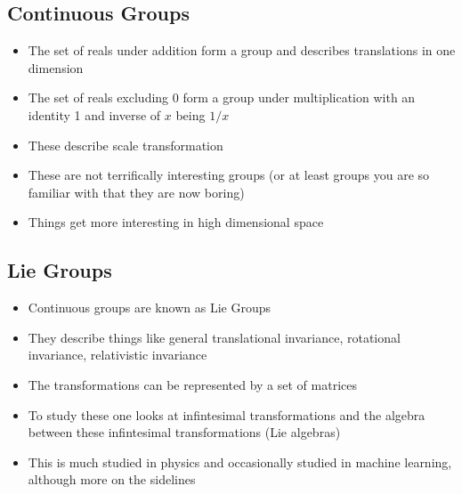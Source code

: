
\begin{slide}
\section{Continuous Groups}

\begin{PauseHighLight}
  \begin{itemize}
  \item The set of reals under addition form a group and describes
    translations in one dimension\pause
  \item The set of reals excluding 0 form a group under multiplication
    with an identity 1 and inverse of $x$ being $1/x$\pause
  \item These describe scale transformation\pause
  \item These are not terrifically interesting groups\pause{} (or at least
    groups you are so familiar with that they are now boring)\pauseb
  \item Things get more interesting in high dimensional space\pauseb
  \end{itemize}
\end{PauseHighLight}

\end{slide}


\begin{slide}
\section{Lie Groups}

\begin{PauseHighLight}
  \begin{itemize}
  \item Continuous groups are known as Lie Groups\pause
  \item They describe things like general translational invariance,
    rotational invariance, relativistic invariance\pause
  \item The transformations can be represented by a set of matrices\pause
  \item To study these one looks at infintesimal transformations and
    the algebra between these infintesimal transformations (Lie
    algebras)\pause
  \item This is much studied in physics and occasionally studied in
    machine learning, although more on the sidelines\pause
  \end{itemize}
\end{PauseHighLight}

\end{slide}


